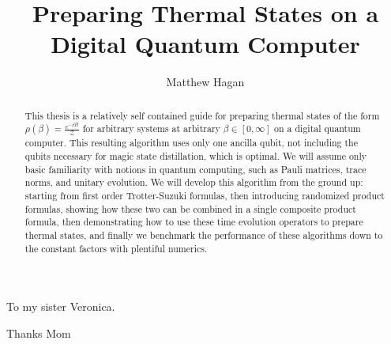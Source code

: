 \documentclass{ut-thesis}
\author{Matthew Hagan}
\title{Preparing Thermal States on a Digital Quantum Computer}
\begin{document}
  \frontmatter
    \maketitle
    \begin{abstract}
      This thesis is a relatively self contained guide for preparing thermal states of the form $\rho(\beta) = \frac{e^{-\beta H}}{\mathcal{Z}}$ for arbitrary systems at arbitrary $\beta \in [0, \infty]$ on a digital quantum computer. This resulting algorithm uses only one ancilla qubit, not including the qubits necessary for magic state distillation, which is optimal. We will assume only basic familiarity with notions in quantum computing, such as Pauli matrices, trace norms, and unitary evolution. We will develop this algorithm from the ground up: starting from first order Trotter-Suzuki formulas, then introducing randomized product formulas, showing how these two can be combined in a single composite product formula, then demonstrating how to use these time evolution operators to prepare thermal states, and finally we benchmark the performance of these algorithms down to the constant factors with plentiful numerics. 
    \end{abstract}
    \begin{dedication}
      To my sister Veronica.
    \end{dedication}
    \begin{acknowledgements}
      Thanks Mom
    \end{acknowledgements}
    \tableofcontents
    \listoftables
    \listoffigures
  \mainmatter
    
    
    
    
    
  \appendix
  
  \backmatter
  \printbibliography[heading=bibintoc]
\end{document}
